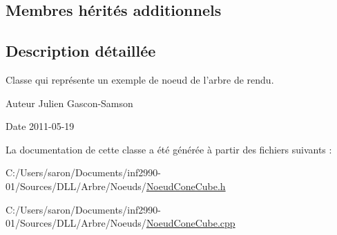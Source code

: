 \subsection*{Membres hérités additionnels}


\subsection{Description détaillée}
Classe qui représente un exemple de noeud de l'arbre de rendu. 

\begin{DoxyAuthor}{Auteur}
Julien Gascon-\/\-Samson 
\end{DoxyAuthor}
\begin{DoxyDate}{Date}
2011-\/05-\/19 
\end{DoxyDate}


La documentation de cette classe a été générée à partir des fichiers suivants \-:\begin{DoxyCompactItemize}
\item 
C\-:/\-Users/saron/\-Documents/inf2990-\/01/\-Sources/\-D\-L\-L/\-Arbre/\-Noeuds/\hyperlink{_noeud_cone_cube_8h}{Noeud\-Cone\-Cube.\-h}\item 
C\-:/\-Users/saron/\-Documents/inf2990-\/01/\-Sources/\-D\-L\-L/\-Arbre/\-Noeuds/\hyperlink{_noeud_cone_cube_8cpp}{Noeud\-Cone\-Cube.\-cpp}\end{DoxyCompactItemize}
